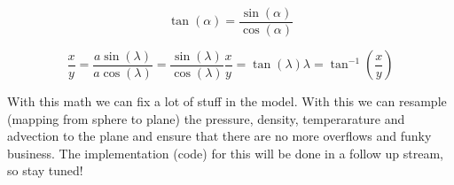 \begin{equation}
    \tan(\alpha) = \frac{\sin(\alpha)}{\cos(\alpha)}
    \label{eq:tan}
\end{equation}

\begin{subequations}
    \begin{equation}
        \frac{x}{y} = \frac{a\sin(\lambda)}{a\cos(\lambda)} = \frac{\sin(\lambda)}{\cos(\lambda)}
        \label{eq:polar lambda1}
    \end{equation}
    \begin{equation}
        \frac{x}{y} = \tan(\lambda)
        \label{eq:polar lambda2}
    \end{equation}
    \begin{equation}
        \lambda = \tan^{-1}(\frac{x}{y})
        \label{eq:polar lambda3}
    \end{equation}
\end{subequations}

With this math we can fix a lot of stuff in the model. With this we can resample (mapping from sphere to plane) the pressure, density, temperarature and advection to the plane and ensure that 
there are no more overflows and funky business. The implementation (code) for this will be done in a follow up stream, so stay tuned!